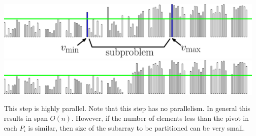 \documentclass[xcolor=x11names, svgnames, rgb]{beamer}
\newtheorem{defin}{Definition}
\begin{document}
\begin{frame}[t]{}
\begin{overprint}
	\includegraphics[width=\linewidth]{imgs/stridedAlgSim/stridedAlgSim_45.eps}
	\onslide<7>\includegraphics[width=\linewidth]{imgs/stridedAlgSim/stridedAlgSim_5.eps}
	\end{overprint}
	\vspace{0.25cm}
	\begin{overprint}
	This step is highly parallel.
	\onslide<7> Note that this step has no parallelism. In general this results in span $O(n)$. However, if the number of elements less than the pivot in each $P_i$ is similar, then size of the subarray to be partitioned can be very small.
	\end{overprint}
\end{frame}

\end{document}
